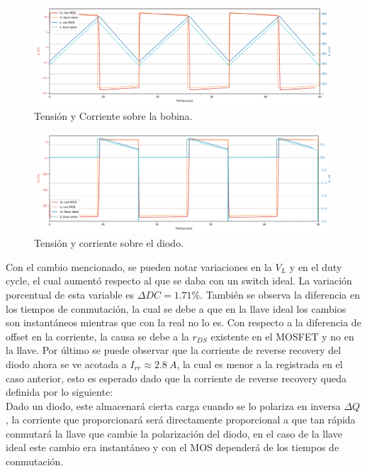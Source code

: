 \begin{multicols}{2}
\begin{figure}[H]
	\centering
	\includegraphics[width=\linewidth]{ImagenesEjercicio-3/il-vl-2v3}
	\caption{Tensión y Corriente sobre la bobina.}
	\label{fig:ej3:Il_Vl}
\end{figure}
\begin{figure}[H]
	\centering
	\includegraphics[width=\linewidth]{ImagenesEjercicio-3/id-vd-2v3}
	\caption{Tensión y corriente sobre el diodo.}
	\label{fig:ej3:Id_Vd}
\end{figure}
\end{multicols}

Con el cambio mencionado, se pueden notar variaciones en la $V_L$ y en el duty cycle, el cual aumentó respecto al que se daba con un switch ideal. La variación porcentual de esta variable es $\Delta DC = 1.71 \% $. También se observa la diferencia en los tiempos de conmutación, la cual se debe a que en la llave ideal los cambios son instantáneos mientras que con la real no lo es. Con respecto a la diferencia de offset en la corriente, la causa se debe a la $r_{DS}$ existente en el MOSFET y no en la llave. Por último se puede observar que la corriente de reverse recovery del diodo ahora se ve acotada a $I_{rr}\approx 2.8 \ A$, la cual es menor a la registrada en el caso anterior, esto es esperado dado que la corriente de reverse recovery queda definida por lo siguiente:\\
Dado un diodo, este almacenará cierta carga cuando se lo polariza en inversa $\Delta Q$, la corriente que proporcionará será directamente proporcional a que tan rápida conmutará la llave que cambie la polarización del diodo, en el caso de la llave ideal este cambio era instantáneo y con el MOS dependerá de los tiempos de conmutación.

